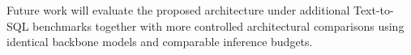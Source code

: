 \documentclass{svproc}
\renewcommand{\bibname}{References}
\begin{document}


Future work will evaluate the proposed architecture under additional Text-to-SQL benchmarks together with more controlled architectural comparisons using identical backbone models and comparable inference budgets.%






%
%


\end{document}
